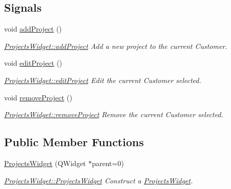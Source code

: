 \subsection*{Signals}
\begin{DoxyCompactItemize}
\item 
\hypertarget{classGui_1_1Widgets_1_1ProjectsWidget_a25a20fde082c2698d7067d10e5795c0f}{}void \hyperlink{classGui_1_1Widgets_1_1ProjectsWidget_a25a20fde082c2698d7067d10e5795c0f}{add\+Project} ()\label{classGui_1_1Widgets_1_1ProjectsWidget_a25a20fde082c2698d7067d10e5795c0f}

\begin{DoxyCompactList}\small\item\em \hyperlink{classGui_1_1Widgets_1_1ProjectsWidget_a25a20fde082c2698d7067d10e5795c0f}{Projects\+Widget\+::add\+Project} Add a new project to the current Customer. \end{DoxyCompactList}\item 
\hypertarget{classGui_1_1Widgets_1_1ProjectsWidget_a8a49da147544ffd78131af2b9289c9d0}{}void \hyperlink{classGui_1_1Widgets_1_1ProjectsWidget_a8a49da147544ffd78131af2b9289c9d0}{edit\+Project} ()\label{classGui_1_1Widgets_1_1ProjectsWidget_a8a49da147544ffd78131af2b9289c9d0}

\begin{DoxyCompactList}\small\item\em \hyperlink{classGui_1_1Widgets_1_1ProjectsWidget_a8a49da147544ffd78131af2b9289c9d0}{Projects\+Widget\+::edit\+Project} Edit the current Customer selected. \end{DoxyCompactList}\item 
\hypertarget{classGui_1_1Widgets_1_1ProjectsWidget_ac713b0c5c9afba988923fe3e29b405dc}{}void \hyperlink{classGui_1_1Widgets_1_1ProjectsWidget_ac713b0c5c9afba988923fe3e29b405dc}{remove\+Project} ()\label{classGui_1_1Widgets_1_1ProjectsWidget_ac713b0c5c9afba988923fe3e29b405dc}

\begin{DoxyCompactList}\small\item\em \hyperlink{classGui_1_1Widgets_1_1ProjectsWidget_ac713b0c5c9afba988923fe3e29b405dc}{Projects\+Widget\+::remove\+Project} Remove the current Customer selected. \end{DoxyCompactList}\end{DoxyCompactItemize}
\subsection*{Public Member Functions}
\begin{DoxyCompactItemize}
\item 
\hyperlink{classGui_1_1Widgets_1_1ProjectsWidget_a400712a956057c7233c396bffeb7a086}{Projects\+Widget} (Q\+Widget $\ast$parent=0)
\begin{DoxyCompactList}\small\item\em \hyperlink{classGui_1_1Widgets_1_1ProjectsWidget_a400712a956057c7233c396bffeb7a086}{Projects\+Widget\+::\+Projects\+Widget} Construct a \hyperlink{classGui_1_1Widgets_1_1ProjectsWidget}{Projects\+Widget}. \end{DoxyCompactList}\end{DoxyCompactItemize}


